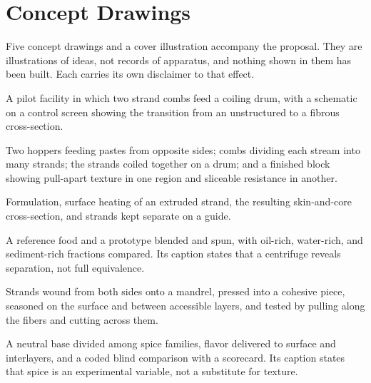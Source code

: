\documentclass[11pt,openany]{book}
\theoremstyle{definition}
\begin{document}
\chapter{Concept Drawings}\label{app:drawings}

Five concept drawings and a cover illustration accompany the proposal. They are illustrations of ideas, not records of apparatus, and nothing shown in them has been built. Each carries its own disclaimer to that effect.

\begin{description}[leftmargin=1.5em,style=nextline]
\item[Cover.] A pilot facility in which two strand combs feed a coiling drum, with a schematic on a control screen showing the transition from an unstructured to a fibrous cross-section.
\item[Drawing 1: bilateral feeds.] Two hoppers feeding pastes from opposite sides; combs dividing each stream into many strands; the strands coiled together on a drum; and a finished block showing pull-apart texture in one region and sliceable resistance in another.
\item[Drawing 2: the heated passage.] Formulation, surface heating of an extruded strand, the resulting skin-and-core cross-section, and strands kept separate on a guide.
\item[Drawing 3: centrifugal comparison.] A reference food and a prototype blended and spun, with oil-rich, water-rich, and sediment-rich fractions compared. Its caption states that a centrifuge reveals separation, not full equivalence.
\item[Drawing 4: coil, press, season, test.] Strands wound from both sides onto a mandrel, pressed into a cohesive piece, seasoned on the surface and between accessible layers, and tested by pulling along the fibers and cutting across them.
\item[Drawing 5: seasoning families.] A neutral base divided among spice families, flavor delivered to surface and interlayers, and a coded blind comparison with a scorecard. Its caption states that spice is an experimental variable, not a substitute for texture.
\end{description}
\end{document}
